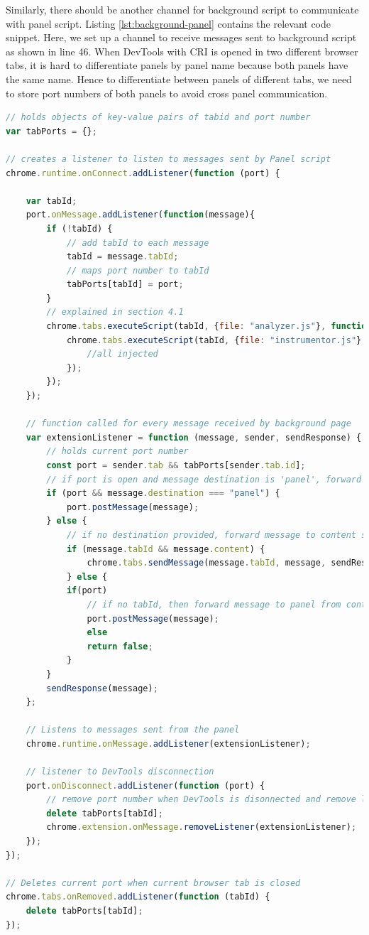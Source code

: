 Similarly, there should be another channel for background script to communicate with panel script. Listing \ref{lst:background-panel} contains the relevant code snippet. Here, we set up a channel to receive messages sent to background script as shown in line 46. When DevTools with CRI is opened in two different browser tabs, it is hard to differentiate panels by panel name because both panels have the same name. Hence to differentiate between panels of different tabs, we need to store port numbers of both panels to avoid cross panel communication. 
\begin{lstlisting}[language=JavaScript, caption=Channel for background script to communicate with Panel script, label={lst:background-panel}]
// holds objects of key-value pairs of tabid and port number
var tabPorts = {};

// creates a listener to listen to messages sent by Panel script
chrome.runtime.onConnect.addListener(function (port) {
	
	var tabId;
	port.onMessage.addListener(function(message){
		if (!tabId) {
			// add tabId to each message
			tabId = message.tabId;
			// maps port number to tabId
			tabPorts[tabId] = port;
		}
		// explained in section 4.1
		chrome.tabs.executeScript(tabId, {file: "analyzer.js"}, function(){
			chrome.tabs.executeScript(tabId, {file: "instrumentor.js"}, function(){
				//all injected
			});
		});
	});
	
	// function called for every message received by background page
	var extensionListener = function (message, sender, sendResponse) {
		// holds current port number		
		const port = sender.tab && tabPorts[sender.tab.id];
		// if port is open and message destination is 'panel', forward message to Panel
		if (port && message.destination === "panel") {
			port.postMessage(message);
		} else {
			// if no destination provided, forward message to content script
			if (message.tabId && message.content) {
				chrome.tabs.sendMessage(message.tabId, message, sendResponse);
			} else {
			if(port)
				// if no tabId, then forward message to panel from content script
				port.postMessage(message);
				else
				return false;
			}	
		}
		sendResponse(message);
	};
	
	// Listens to messages sent from the panel
	chrome.runtime.onMessage.addListener(extensionListener);
	
	// listener to DevTools disconnection
	port.onDisconnect.addListener(function (port) {
		// remove port number when DevTools is disonnected and remove listener for message receivers
		delete tabPorts[tabId];
		chrome.extension.onMessage.removeListener(extensionListener);
	});
});

// Deletes current port when current browser tab is closed
chrome.tabs.onRemoved.addListener(function (tabId) {
	delete tabPorts[tabId];
});

\end{lstlisting}

